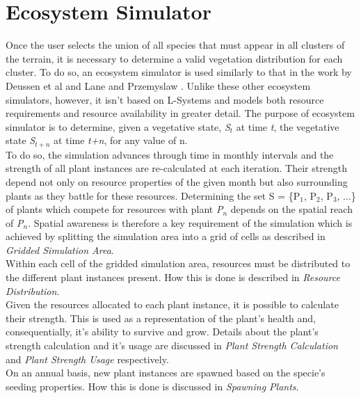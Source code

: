 \section{Ecosystem Simulator}

Once the user selects the union of all species that must appear in all clusters of the terrain, it is necessary to determine a valid vegetation distribution for each cluster. To do so, an ecosystem simulator is used similarly to that in the work by Deussen et al \cite{Deussen1998} and Lane and Przemyslaw \cite{Lane2002}. Unlike these other ecosystem simulators, however, it isn't based on L-Systems and models both resource requirements and resource availability in greater detail. The purpose of ecosystem simulator is to determine, given a vegetative state, \textit{S$_{t}$} at time \textit{t}, the vegetative state \textit{S$_{t+n}$} at time \textit{t+n}, for any value of n.  \\

To do so, the simulation advances through time in monthly intervals and the strength of all plant instances are re-calculated at each iteration. Their strength depend not only on resource properties of the given month but also surrounding plants as they battle for these resources. Determining the set S = \{P$_{1}$, P$_{2}$, P$_{3}$, ...\} of plants which compete for resources with plant \textit{P$_{n}$} depends on the spatial reach of \textit{P$_{n}$}. Spatial awareness is therefore a key requirement of the simulation which is achieved by splitting the simulation area into a grid of cells as described in \textit{Gridded Simulation Area}.\\

Within each cell of the gridded simulation area, resources must be distributed to the different plant instances present. How this is done is described in \textit{Resource Distribution}. \\

Given the resources allocated to each plant instance, it is possible to calculate their strength. This is used as a representation of the plant's health and, consequentially, it's ability to survive and grow. Details about the plant's strength calculation and it's usage are discussed in \textit{Plant Strength Calculation} and \textit{Plant Strength Usage} respectively.\\

On an annual basis, new plant instances are spawned based on the specie's seeding properties. How this is done is discussed in \textit{Spawning Plants}.\\

